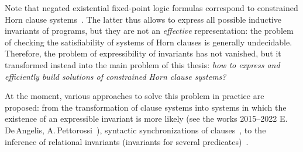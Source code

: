 Note that negated existential fixed-point logic formulas correspond to constrained Horn clause systems~\cite{Bjorner2015}.
The latter thus allows to express all possible inductive invariants of programs, but they are not an \emph{effective} representation: the problem of checking the satisfiability of systems of Horn clauses is generally undecidable.
Therefore, the problem of expressibility of invariants has not vanished, but it transformed instead into the main problem of this thesis:
\emph{how to express and efficiently build solutions of constrained Horn clause systems?}


At the moment, various approaches to solve this problem in practice are proposed: from the transformation of clause systems into systems in which the existence of an expressible invariant is more likely (see the works \numrange{2015}{2022} E.\,De\,Angelis,  A.\,Pettorossi~\cite{angelis_fioravanti_pettorossi_proietti_2015,10.1007/978-3-662-53413-7_8,10.1093/logcom/exab090,pettorossi_proietti_2022,10.1007/978-3-030-51074-9_6,angelis_fioravanti_pettorossi_proietti_2018}), syntactic synchronizations of clauses~\cite{10.1007/978-3-662-53413-7_8,LPAR-21:Synchronizing_Constrained_Horn_Clauses}, to the inference of relational invariants (invariants for several predicates)~\cite{mordvinov2020,DBLP:journals/corr/abs-2304-12588}.


